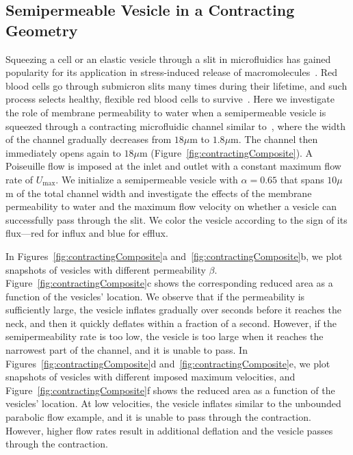\documentclass[9pt,twocolumn,twoside,lineno]{pnas-new}
\begin{document}
\subsection*{Semipermeable Vesicle in a Contracting Geometry} 

Squeezing a cell or an elastic vesicle through a slit in microfluidics
has gained popularity for its application in stress-induced release of
macromolecules~\cite{ShareiEtAl2013_PNAS, Pak2015_PNAS,
ZhangShenHoganBarakatMisbah2018_BJ, LuoBai2019_PoF}. Red blood cells go
through submicron slits many times during their lifetime, and such
process selects healthy, flexible red blood cells to
survive~\cite{wu2015critical,LuPeng2019_PoF}. Here we investigate the
role of membrane permeability to water when a semipermeable vesicle is
squeezed through a contracting microfluidic channel similar
to~\cite{wu2015critical}, where the width of the channel gradually
decreases from $18 \mu$m to $1.8 \mu$m. The channel then immediately
opens again to $18 \mu$m (Figure~\ref{fig:contractingComposite}). A
Poiseuille flow is imposed at the inlet and outlet with a constant
maximum flow rate of $U_{\max}$. We initialize a semipermeable vesicle
with $\alpha = 0.65$ that spans $10 \mu$m of the total channel width and
investigate the effects of the membrane permeability to water and the
maximum flow velocity on whether a vesicle can successfully pass through
the slit. We color the vesicle according to the sign of its flux---red
for influx and blue for efflux.

In Figures~\ref{fig:contractingComposite}a
and~\ref{fig:contractingComposite}b, we plot snapshots of vesicles with
different permeability $\beta$. Figure~\ref{fig:contractingComposite}c
shows the corresponding reduced area as a function of the vesicles'
location. We observe that if the permeability is sufficiently large, the
vesicle inflates gradually over seconds before it reaches the neck, and
then it quickly deflates within a fraction of a second. However, if the
semipermeability rate is too low, the vesicle is too large when it
reaches the narrowest part of the channel, and it is unable to pass. In
Figures~\ref{fig:contractingComposite}d
and~\ref{fig:contractingComposite}e, we plot snapshots of vesicles with
different imposed maximum velocities, and
Figure~\ref{fig:contractingComposite}f shows the reduced area as a
function of the vesicles' location. At low velocities, the vesicle
inflates similar to the unbounded parabolic flow example, and it is
unable to pass through the contraction. However, higher flow rates
result in additional deflation and the vesicle passes through the
contraction.
\end{document}
